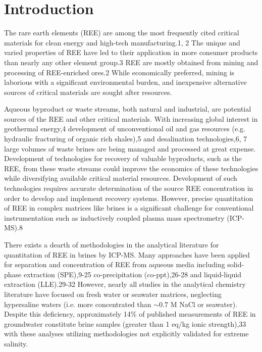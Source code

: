 \section{Introduction}

The rare earth elements (REE) are among the most frequently cited critical materials for clean energy and high-tech manufacturing.1, 2 
The unique and varied properties of REE have led to their application in more consumer products than nearly any other element group.3
REE are mostly obtained from mining and processing of REE-enriched ores.2
While economically preferred, mining is laborious with a significant environmental burden, and inexpensive alternative sources of critical materials are sought after resources.

Aqueous byproduct or waste streams, both natural and industrial, are potential sources of the REE and other critical materials.
With increasing global interest in geothermal energy,4
development of unconventional oil and gas resources (e.g. hydraulic fracturing of organic rich shales),5
and desalination technologies,6, 7
large volumes of waste brines are being managed and processed at great expense.
Development of technologies for recovery of valuable byproducts, such as the REE, from these waste streams could improve the economics of these technologies while diversifying available critical material resources.
Development of such technologies requires accurate determination of the source REE concentration in order to develop and implement recovery systems.
However, precise quantitation of REE in complex matrices like brines is a significant challenge for conventional instrumentation such as inductively coupled plasma mass spectrometry (ICP-MS).8

There exists a dearth of methodologies in the analytical literature for quantitation of REE in brines by ICP-MS.
Many approaches have been applied for separation and concentration of REE from aqueous media including solid-phase extraction (SPE),9-25
co-precipitation (co-ppt),26-28
and liquid-liquid extraction (LLE).29-32
However, nearly all studies in the analytical chemistry literature have focused on fresh water or seawater matrices, neglecting hypersaline waters (i.e. more concentrated than $\sim0.7$ M NaCl or seawater).
Despite this deficiency, approximately 14\% of published measurements of REE in groundwater constitute brine samples (greater than 1 eq/kg ionic strength),33
with these analyses utilizing methodologies not explicitly validated for extreme salinity.

